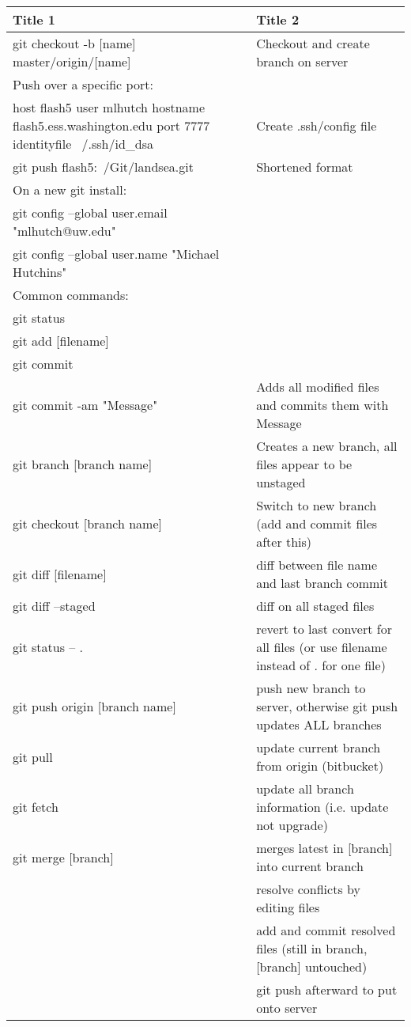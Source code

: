 \begin{table}[h!]
\begin{center}
\begin{tabular}{|p{3in}|p{3in}|}

\hline
{\bf Title 1} &	{\bf Title 2} \\
\hline 
git checkout -b [name] master/origin/[name] & Checkout and create branch on server  \\

Push over a specific port: &  \\

host flash5 
user mlhutch
hostname flash5.ess.washington.edu
port 7777
identityfile ~/.ssh/id\_dsa & Create .ssh/config file  \\

git push flash5:~/Git/landsea.git & Shortened format  \\

On a new git install: & \\
git config --global user.email "mlhutch@uw.edu" & \\
git config --global user.name "Michael Hutchins" & \\

Common commands: & \\
git status & \\
git add [filename] & \\
git commit & \\
git commit -am "Message" & Adds all modified files and commits them with Message \\
git branch [branch name] & Creates a new branch, all files appear to be unstaged \\
git checkout [branch name] & Switch to new branch (add and commit files after this) \\
git diff [filename] & diff between file name and last branch commit \\
git diff --staged & diff on all staged files \\
git status -- . & revert to last convert for all files (or use filename instead of . for one file) \\
git push origin [branch name] & push new branch to server, otherwise git push updates ALL branches \\
git pull & update current branch from origin (bitbucket) \\
git fetch & update all branch information (i.e. update not upgrade) \\
git merge [branch] & merges latest in [branch] into current branch \\
& resolve conflicts by editing files \\
& add and commit resolved files (still in branch, [branch] untouched) \\
& git push afterward to put onto server \\


\end{tabular}
\end{center}
\end{table}

